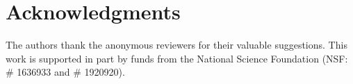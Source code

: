 \documentclass[12pt,a4paper]{article}
\begin{document}
\section*{Acknowledgments}
The authors thank the anonymous reviewers for their valuable suggestions. This work is supported in part by funds from the National Science Foundation (NSF: \# 1636933 and \# 1920920).



\printbibliography





\renewcommand\theequation{\Alph{section}\arabic{equation}} %
\renewcommand\thefigure{\Alph{section}\arabic{figure}} %
\renewcommand\thetable{\Alph{section}\arabic{table}} %
\end{document}
